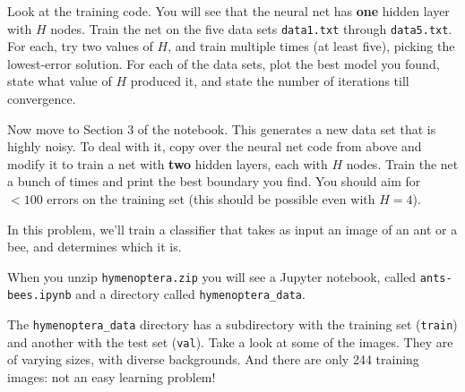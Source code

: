 \documentclass{article}
\begin{document}
\begin{probset}
\begin{progprob}
    \begin{subprobset}
    \begin{subprob}
        Look at the training code. You will see that the neural net has \textbf{one} hidden layer with $H$ nodes. Train the net on the five data sets \texttt{data1.txt} through \texttt{data5.txt}. For each, try two values of $H$, and train multiple times (at least five), picking the lowest-error solution. For each of the data sets, plot the best model you found, state what value of $H$ produced it, and state the number of iterations till convergence.

        \begin{soln}

        \end{soln}
    \end{subprob}

    \begin{subprob}
        Now move to Section 3 of the notebook. This generates a new data set that is highly noisy. To deal with it, copy over the neural net code from above and modify it to train a net with \textbf{two} hidden layers, each with $H$ nodes. Train the net a bunch of times and print the best boundary you find. You should aim for $< 100$ errors on the training set (this should be possible even with $H = 4$).

        \begin{soln}

        \end{soln}
    \end{subprob}
    \end{subprobset}
\end{progprob}

\begin{progprob}
    In this problem, we'll train a classifier that takes as input an image of an ant or a bee, and determines which it is.

    When you unzip \texttt{hymenoptera.zip} you will see a Jupyter notebook, called \texttt{ants-bees.ipynb} and a directory called \texttt{hymenoptera\_data}.

    \begin{subprobset}
    \begin{subprob}
        The \texttt{hymenoptera\_data} directory has a subdirectory with the training set (\texttt{train}) and another with the test set (\texttt{val}). Take a look at some of the images. They are of varying sizes, with diverse backgrounds. And there are only 244 training images: not an easy learning problem!


\end{subprob}
\end{subprobset}
\end{progprob}
\end{probset}
\end{document}
